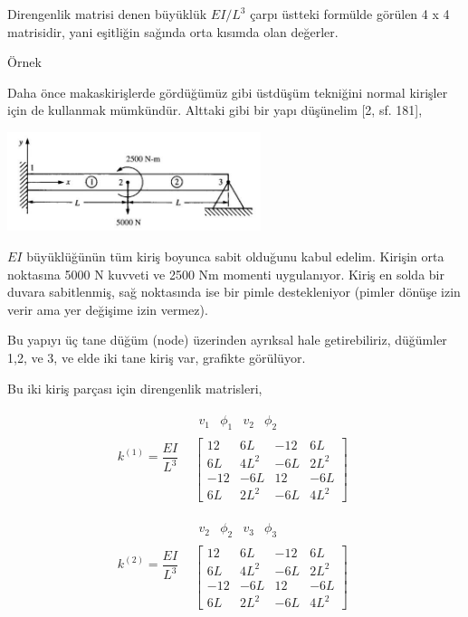 \documentclass[12pt,fleqn]{article}\usepackage{../../common}
\begin{document}
Direngenlik matrisi denen büyüklük $EI / L^3$ çarpı üstteki formülde görülen
4 x 4 matrisidir, yani eşitliğin sağında orta kısımda olan değerler.

Örnek

Daha önce makaskirişlerde gördüğümüz gibi üstdüşüm tekniğini normal kirişler
için de kullanmak mümkündür. Alttaki gibi bir yapı düşünelim [2, sf. 181],

\includegraphics[width=20em]{phy_020_strs_06_01.jpg}

$EI$ büyüklüğünün tüm kiriş boyunca sabit olduğunu kabul edelim. Kirişin orta
noktasına 5000 N kuvveti ve 2500 Nm momenti uygulanıyor. Kiriş en solda bir
duvara sabitlenmiş, sağ noktasında ise bir pimle destekleniyor (pimler
dönüşe izin verir ama yer değişime izin vermez). 

Bu yapıyı üç tane düğüm (node) üzerinden ayrıksal hale getirebiliriz,
düğümler 1,2, ve 3, ve elde iki tane kiriş var, grafikte görülüyor.

Bu iki kiriş parçası için direngenlik matrisleri,

$$
k^{(1)} = \frac{EI}{L^3}
\begin{array}{cc} & \begin{array}{rrrr} v_1 & \phi_1 & v_2 & \phi_2 \end{array} \\ &
\left[
\begin{array}{cccc}
  12 & 6L & -12 & 6L \\
  6L & 4L^2 & -6L & 2L^2 \\
  -12 & -6L & 12 & -6L \\
  6L & 2L^2 & -6L & 4L^2
\end{array}
\right]
\end{array} 
$$

$$
k^{(2)} = \frac{EI}{L^3}
\begin{array}{cc} & \begin{array}{rrrr} v_2 & \phi_2 & v_3 & \phi_3 \end{array} \\ &
\left[
\begin{array}{cccc}
  12 & 6L & -12 & 6L \\
  6L & 4L^2 & -6L & 2L^2 \\
  -12 & -6L & 12 & -6L \\
  6L & 2L^2 & -6L & 4L^2
\end{array}
\right]
\end{array} 
$$
\end{document}
